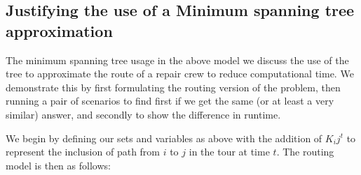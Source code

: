 \documentclass{article}
\begin{document}
	\subsection{Justifying the use of a Minimum spanning tree approximation}
	The minimum spanning tree usage in the above model we discuss the use of the tree to approximate the route of a repair crew to reduce computational time. We demonstrate this by first formulating the routing version of the problem, then running a pair of scenarios to find first if we get the same (or at least a very similar) answer, and secondly to show the difference in runtime.
	
	We begin by defining our sets and variables as above with the addition of $K_ij^t$ to represent the inclusion of path from $i$ to $j$ in the tour at time $t$. The routing model is then as follows:
	
\end{document}
